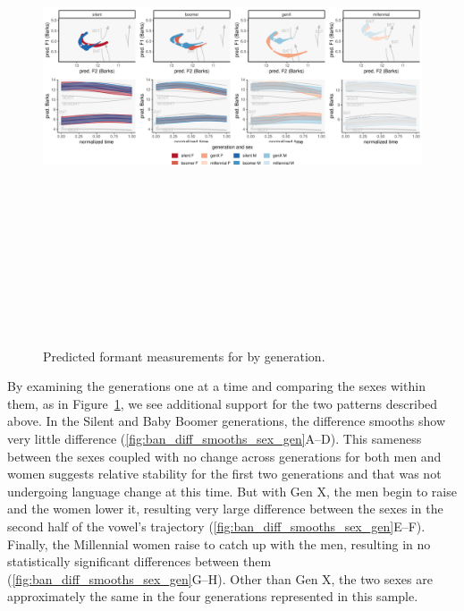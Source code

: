 \begin{figure}[p]
	\centering
	\includegraphics[angle = 90, origin = c, height = 6in]{Figures/BAN/BAN_sex_panel_plot_wide.pdf}
	\caption[Predicted formant measurements for \ban by generation.]{Predicted formant measurements for \ban by generation.}
	\label{fig:BAN_sex_panel_plot_wide}
\end{figure}

By examining the generations one at a time and comparing the sexes within them, as in Figure~\ref{fig:BAN_sex_panel_plot_wide}, we see additional support for the two patterns described above. In the Silent and Baby Boomer generations, the difference smooths show very little difference (\ref{fig:ban_diff_smooths_sex_gen}A--D). This sameness between the sexes coupled with no change across generations for both men and women suggests relative stability for the first two generations and that \ban was not undergoing language change at this time. But with Gen X, the men begin to raise \ban and the women lower it, resulting very large difference between the sexes in the second half of the vowel's trajectory (\ref{fig:ban_diff_smooths_sex_gen}E--F). Finally, the Millennial women raise \ban to catch up with the men, resulting in no statistically significant differences between them (\ref{fig:ban_diff_smooths_sex_gen}G--H). Other than Gen X, the two sexes are approximately the same in the four generations represented in this sample.

